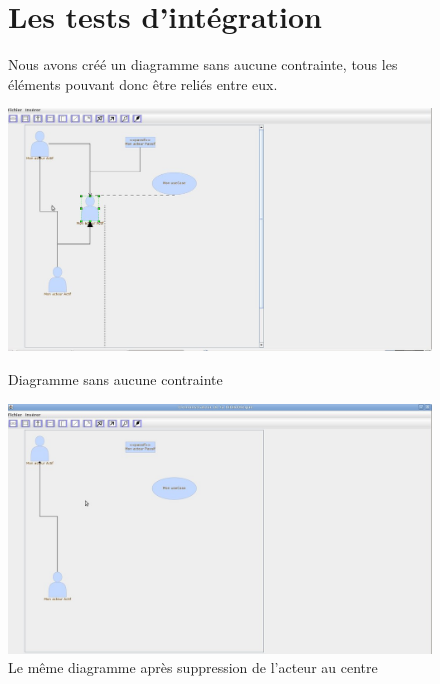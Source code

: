 \documentclass[12pt,a4paper,openany]{report}
\begin{document}
			\begin{figure}[H]
				\section{Les tests d'intégration}
					\begin{flushleft} Nous avons créé un diagramme sans aucune contrainte, tous les éléments pouvant donc être reliés entre eux. \end{flushleft}
					\centering
					\includegraphics[width=18cm]{integration1.jpg}
					\caption{Diagramme sans aucune contrainte}
				\includegraphics[width=18cm]{integration2.jpg}
				\caption{Le même diagramme après suppression de l'acteur au centre}
			\end{figure}
\end{document}
